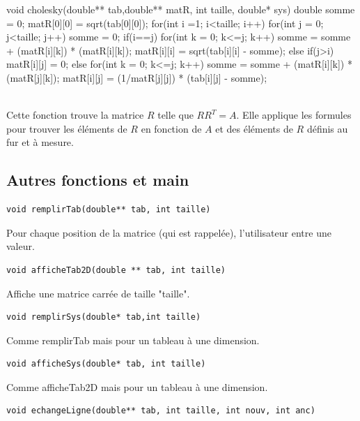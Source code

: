 \documentclass{article}
\begin{document}
\begin{boxedverbatim}
void cholesky(double** tab,double** matR, int taille, double* sys) {
  double somme = 0;
  matR[0][0] = sqrt(tab[0][0]);
  for(int i =1; i<taille; i++){
    for(int j = 0; j<taille; j++){
      somme = 0;
      if(i==j){
        for(int k = 0; k<=j; k++){
          somme = somme + (matR[i][k]) * (matR[i][k]);
        }
        matR[i][i] = sqrt(tab[i][i] - somme);
      }
      else if(j>i){
        matR[i][j] = 0;
      }
      else{
        for(int k = 0; k<=j; k++){
          somme = somme + (matR[i][k]) * (matR[j][k]);
        }
        matR[i][j] = (1/matR[j][j]) * (tab[i][j] - somme);
      }
    }
  }
}
\end{boxedverbatim}
\\
Cette fonction trouve la matrice $R$ telle que $R R^T = A$. Elle applique les formules pour trouver les éléments de $R$ en fonction de $A$ et des éléments de $R$ définis au fur et à mesure.

\subsection{Autres fonctions et main}

\begin{verbatim}
void remplirTab(double** tab, int taille)
\end{verbatim}



Pour chaque position de la matrice (qui est rappelée), l'utilisateur entre une valeur.
\\
\begin{verbatim}
void afficheTab2D(double ** tab, int taille)
\end{verbatim}



Affiche une matrice carrée de taille "taille".
\\
\begin{verbatim}
void remplirSys(double* tab,int taille)
\end{verbatim}



Comme remplirTab mais pour un tableau à une dimension.
\\
\begin{verbatim}
void afficheSys(double* tab, int taille)
\end{verbatim}



Comme afficheTab2D mais pour un tableau à une dimension.
\\
\begin{verbatim}
void echangeLigne(double** tab, int taille, int nouv, int anc)
\end{verbatim}
\end{document}
